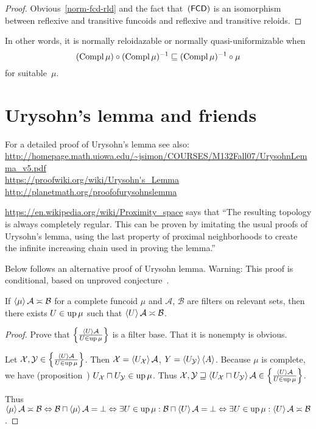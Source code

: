 \begin{proof}
Obvious~\ref{norm-fcd-rld} and the fact that~$(\mathsf{FCD})$ is an isomorphism between reflexive and transitive funcoids
and reflexive and transitive reloids.
\end{proof}

In other words, it is normally reloidazable or normally quasi-uniformizable when
\[ (\operatorname{Compl}\mu)\circ(\operatorname{Compl}\mu)^{-1}\sqsubseteq(\operatorname{Compl}\mu)^{-1}\circ\mu \]
for suitable~$\mu$.

\section{Urysohn's lemma and friends}

For a detailed proof of Urysohn's lemma see also:\\
\url{http://homepage.math.uiowa.edu/~jsimon/COURSES/M132Fall07/UrysohnLemma_v5.pdf}\\
\url{https://proofwiki.org/wiki/Urysohn's_Lemma}\\
\url{http://planetmath.org/proofofurysohnslemma}

\url{https://en.wikipedia.org/wiki/Proximity_space} says that
``The resulting topology is always completely regular. This can be proven by imitating the usual proofs of Urysohn's lemma, using the last property of proximal neighborhoods to create the infinite increasing chain used in proving the lemma.''

Below follows an alternative proof of Urysohn lemma. Warning: This proof is conditional,
based on unproved conjecture~.

\begin{lem}
  If $\left\langle \mu\right\rangle \mathcal{A} \asymp \mathcal{B}$ for a complete
  funcoid $\mu$ and $\mathcal{A}$, $\mathcal{B}$ are filters on relevant
  sets, then there exists $U \in \operatorname{up} \mu$ such that $\left\langle U\right\rangle \mathcal{A} \asymp \mathcal{B}$.
\end{lem}

\begin{proof}
  Prove that $\left\{ \frac{ \left\langle U\right\rangle \mathcal{A} }{
  U \in \operatorname{up} \mu }\right\}$ is a filter base. That it
  is nonempty is obvious.
  
  Let $\mathcal{X}, \mathcal{Y} \in \left\{ \frac{ \left\langle U\right\rangle \mathcal{A}
  }{ U \in \operatorname{up} \mu }\right\}$. Then
  $\mathcal{X} = \left\langle U_{\mathcal{X}}\right\rangle \mathcal{A}$, $Y = \left\langle 
  U_{\mathcal{Y}}\right\rangle \left\langle A\right\rangle$. Because $\mu$ is complete, we have
  (proposition~) $U_{\mathcal{X}} \sqcap U_{\mathcal{Y}} \in \operatorname{up}
  \mu$. Thus $\mathcal{X}, \mathcal{Y} \sqsupseteq \left\langle 
  U_{\mathcal{X}} \sqcap U_{\mathcal{Y}} \right\rangle \mathcal{A} \in \left\{ \frac{
  \left\langle U\right\rangle \mathcal{A} }{ U \in \operatorname{up} \mu }\right\}$.
  
  Thus $\left\langle \mu\right\rangle \mathcal{A} \asymp \mathcal{B}
  \Leftrightarrow \mathcal{B} \sqcap \left\langle \mu\right\rangle \mathcal{A} =
  \bot \Leftrightarrow \exists U \in \operatorname{up} \mu: \mathcal{B} \sqcap
  \left\langle U\right\rangle \mathcal{A} = \bot \Leftrightarrow \exists U \in \operatorname{up}
  \mu: \left\langle U\right\rangle \mathcal{A} \asymp \mathcal{B}$.
\end{proof}

